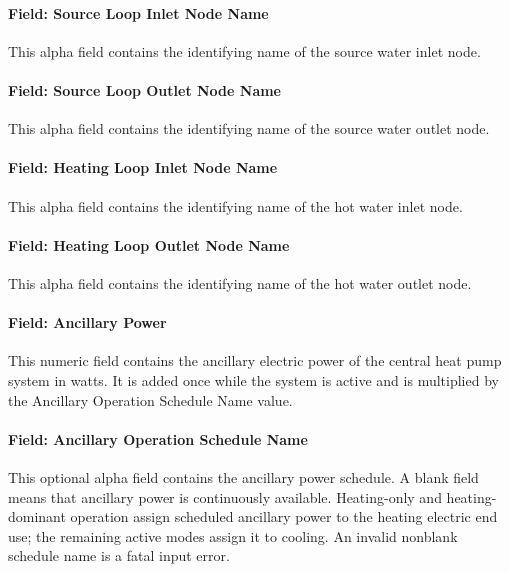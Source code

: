 \paragraph{Field: Source Loop Inlet Node Name}\label{field-source-loop-inlet-node-name}

This alpha field contains the identifying name of the source water inlet node.

\paragraph{Field: Source Loop Outlet Node Name}\label{field-source-loop-outlet-node-name}

This alpha field contains the identifying name of the source water outlet node.

\paragraph{Field: Heating Loop Inlet Node Name}\label{field-heating-loop-inlet-node-name}

This alpha field contains the identifying name of the hot water inlet node.

\paragraph{Field: Heating Loop Outlet Node Name}\label{field-heating-loop-outlet-node-name}

This alpha field contains the identifying name of the hot water outlet node.

\paragraph{Field: Ancillary Power}\label{field-ancillary-power-000}

This numeric field contains the ancillary electric power of the central heat pump system in watts. It is added once while the system is active and is multiplied by the Ancillary Operation Schedule Name value.

\paragraph{Field: Ancillary Operation Schedule Name}\label{field-ancillary-operation-schedule-name}

This optional alpha field contains the ancillary power schedule. A blank field means that ancillary power is continuously available. Heating-only and heating-dominant operation assign scheduled ancillary power to the heating electric end use; the remaining active modes assign it to cooling. An invalid nonblank schedule name is a fatal input error.

